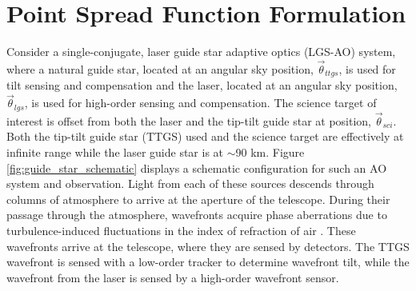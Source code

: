 \section{Point Spread Function Formulation}
\label{sec:psfform}

Consider a single-conjugate, laser guide star adaptive optics
(LGS-AO) system, where a natural guide
star, located at an angular sky position, $\vec{\theta}_{ttgs}$,
 is used for
tilt sensing and compensation and the laser, located at an angular sky position,
$\vec{\theta}_{lgs}$, is used for high-order sensing and compensation. 
The science target of interest is offset from both the laser and the
tip-tilt guide star at position, $\vec{\theta}_{sci}$.  
Both the tip-tilt guide star (TTGS) used and the science
target are effectively at infinite range while the laser guide star is
at $\sim$90 km. 
Figure \ref{fig:guide_star_schematic} displays a schematic configuration for
such an AO system and observation.
Light from each of these sources descends
through columns of atmosphere to arrive at the aperture of the
telescope.  During their passage through the atmosphere, wavefronts
acquire phase aberrations due to turbulence-induced fluctuations in
the index of refraction of air \cite{Kolmogorov:1941}.
These wavefronts arrive at the telescope, where they are sensed by
detectors. The TTGS wavefront is sensed with a low-order tracker to determine wavefront
tilt, while the wavefront from the laser is sensed by a high-order 
wavefront sensor.  




